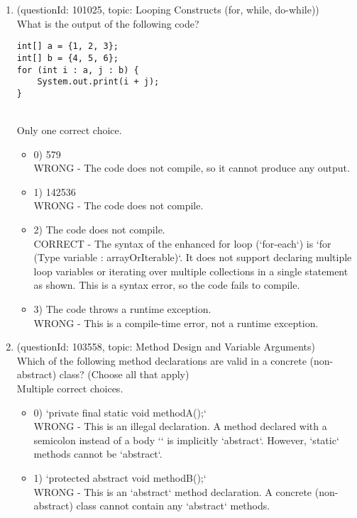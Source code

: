 \documentclass[12pt]{article}
\begin{document}
\begin{enumerate}[label=(\arabic*)]
\begin{itemize}
\end{itemize}
\item (questionId: 101025, topic: Looping Constructs (for, while, do-while)) \\ 
What is the output of the following code?\n\begin{verbatim}
int[] a = {1, 2, 3};
int[] b = {4, 5, 6};
for (int i : a, j : b) {
    System.out.print(i + j);
}
\end{verbatim}
\\ \noindent Only one correct choice. 
\begin{itemize}
\item 0) 579
 \\ 
WRONG - The code does not compile, so it cannot produce any output.

\item 1) 142536
 \\ 
WRONG - The code does not compile.

\item 2) The code does not compile.
 \\ 
CORRECT - The syntax of the enhanced for loop (`for-each`) is `for (Type variable : arrayOrIterable)`. It does not support declaring multiple loop variables or iterating over multiple collections in a single statement as shown. This is a syntax error, so the code fails to compile.

\item 3) The code throws a runtime exception.
 \\ 
WRONG - This is a compile-time error, not a runtime exception.

\end{itemize}
\item (questionId: 103558, topic: Method Design and Variable Arguments) \\ 
Which of the following method declarations are valid in a concrete (non-abstract) class? (Choose all that apply)
\\ \noindent Multiple correct choices. 
\begin{itemize}
\item 0) `private final static void methodA();`
 \\ 
WRONG - This is an illegal declaration. A method declared with a semicolon instead of a body `{}` is implicitly `abstract`. However, `static` methods cannot be `abstract`.

\item 1) `protected abstract void methodB();`
 \\ 
WRONG - This is an `abstract` method declaration. A concrete (non-abstract) class cannot contain any `abstract` methods.


\end{itemize}
\end{enumerate}
\end{document}
